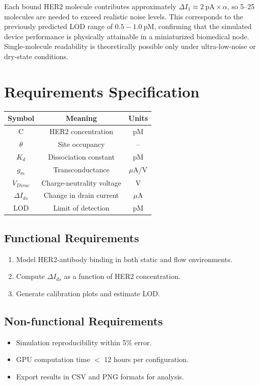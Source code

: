 \documentclass[12pt,a4paper]{report}
\begin{document}
Each bound HER2 molecule contributes approximately
\(\Delta I_{1} \approx 2~\text{pA}\times\alpha\),
so 5–25 molecules are needed to exceed realistic noise levels.
This corresponds to the previously predicted LOD range of \(0.5{-}1.0~\text{pM}\),
confirming that the simulated device performance is physically attainable in a
miniaturized biomedical node. Single-molecule readability is theoretically possible only
under ultra-low-noise or dry-state conditions.






\chapter{Requirements Specification}
\begin{center}
\begin{tabular}{|c|c|c|}
\hline
\textbf{Symbol} & \textbf{Meaning} & \textbf{Units} \\
\hline
C & HER2 concentration & pM \\
$\theta$ & Site occupancy & -- \\
$K_d$ & Dissociation constant & pM \\
$g_m$ & Transconductance & $\mu$A/V \\
$V_{Dirac}$ & Charge-neutrality voltage & V \\
$\Delta I_{ds}$ & Change in drain current & $\mu$A \\
LOD & Limit of detection & pM \\
\hline
\end{tabular}
\end{center}

\section*{Functional Requirements}
\begin{enumerate}
  \item Model HER2-antibody binding in both static and flow environments.
  \item Compute $\Delta I_{ds}$ as a function of HER2 concentration.
  \item Generate calibration plots and estimate LOD.
\end{enumerate}

\section*{Non-functional Requirements}
\begin{itemize}
  \item Simulation reproducibility within 5\% error.
  \item GPU computation time $<$ 12 hours per configuration.
  \item Export results in CSV and PNG formats for analysis.
\end{itemize}
\end{document}
